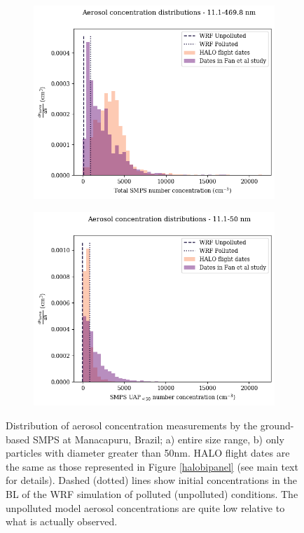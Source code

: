\documentclass{article}
\begin{document}
\begin{figure}[ht]
	\centering
	\begin{subfigure}{0.7\textwidth}
		\includegraphics[width=\textwidth]{goama/v1_FINAL_tot_compare_nconc_hist_alldates_figure.png}
		\label{goamatothist}
		\caption{}
	\end{subfigure}
	\begin{subfigure}{0.7\textwidth}
		\includegraphics[width=\textwidth]{goama/v1_FINAL_uap50_compare_nconc_hist_alldates_figure.png}
		\label{goamauap50hist}
		\caption{}
	\end{subfigure}
	\caption{Distribution of aerosol concentration measurements by the ground-based SMPS at Manacapuru, Brazil; a) entire size range, b) only particles with diameter greater than 50nm. HALO flight dates are the same as those represented in Figure \ref{halobipanel} (see main text for details). Dashed (dotted) lines show initial concentrations in the BL of the WRF simulation of polluted (unpolluted) conditions. The unpolluted model aerosol concentrations are quite low relative to what is actually observed.}
	\label{goamahist}
\end{figure}
\end{document}
